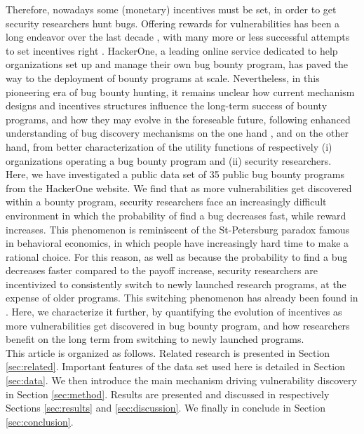 Therefore, nowadays some (monetary) incentives must be set, in order to get security researchers hunt bugs. Offering rewards for vulnerabilities has been a long endeavor over the last decade \cite{bohme2006comparison}, with many more or less successful attempts to set incentives right \cite{finifter2013empirical,zhao2014exploratory,zhao2015empirical}. HackerOne, a leading online service dedicated to help organizations set up and manage their own bug bounty program, has paved the way to the deployment of bounty programs at scale. Nevertheless, in this pioneering era of bug bounty hunting, it remains unclear how current mechanism designs and incentives structures influence the long-term success of bounty programs, and how they may evolve in the foreseable future, following enhanced understanding of bug discovery mechanisms on the one hand \cite{zhao2016empirical}, and on the other hand, from better characterization of the utility functions of respectively (i) organizations operating a bug bounty program and (ii) security researchers.\\

Here, we have investigated a public data set of 35 public bug bounty programs from the HackerOne website. We find that as more vulnerabilities get discovered within a bounty program, security researchers face an increasingly difficult environment in which the probability of find a bug decreases fast, while reward increases. This phenomenon is reminiscent of the St-Petersburg paradox famous in behavioral economics, in which people have increasingly hard time to make a rational choice. For this reason, as well as because the probability to find a bug decreases faster compared to the payoff increase, security researchers are incentivized to consistently switch to newly launched research programs, at the expense of older programs. This switching phenomenon has already been found in \cite{zhao2015empirical}. Here, we characterize it further, by quantifying the evolution of incentives as more vulnerabilities get discovered in bug bounty program, and how researchers benefit on the long term from switching to newly launched programs.\\

This article is organized as follows. Related research is presented in Section \ref{sec:related}. Important features of the data set used here is detailed in Section \ref{sec:data}. We then introduce the main mechanism driving vulnerability discovery in Section \ref{sec:method}. Results are presented and discussed in respectively Sections \ref{sec:results} and \ref{sec:discussion}. We finally in conclude in Section \ref{sec:conclusion}.